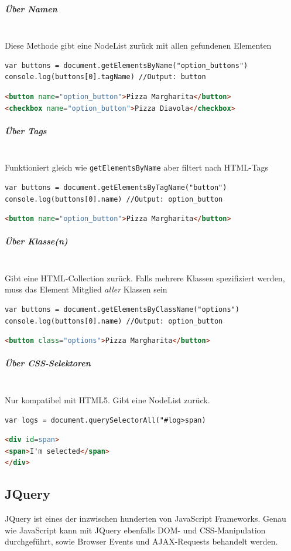 \documentclass[a4paper, 11pt]{article}
\newcommand{\code}[1]{\texttt{#1}}
\begin{document}
\subparagraph{Über Namen}\mbox{}\\
Diese Methode gibt eine NodeList zurück mit allen gefundenen Elementen
\begin{lstlisting}
var buttons = document.getElementsByName("option_buttons")
console.log(buttons[0].tagName) //Output: button
\end{lstlisting}
\begin{lstlisting}[language=html]
<button name="option_button">Pizza Margharita</button>
<checkbox name="option_button">Pizza Diavola</checkbox>
\end{lstlisting}

\subparagraph{Über Tags}\mbox{}\\
Funktioniert gleich wie \code{getElementsByName} aber filtert nach HTML-Tags
\begin{lstlisting}
var buttons = document.getElementsByTagName("button")
console.log(buttons[0].name) //Output: option_button
\end{lstlisting}
\begin{lstlisting}[language=html]
<button name="option_button">Pizza Margharita</button>
\end{lstlisting}

\subparagraph{Über Klasse(n)}\mbox{}\\
Gibt eine HTML-Collection zurück. Falls mehrere Klassen spezifiziert werden, muss das Element Mitglied \textit{aller} Klassen sein
\begin{lstlisting}
var buttons = document.getElementsByClassName("options")
console.log(buttons[0].name) //Output: option_button
\end{lstlisting}
\begin{lstlisting}[language=html]
<button class="options">Pizza Margharita</button>
\end{lstlisting}

\subparagraph{Über CSS-Selektoren}\mbox{}\\
Nur kompatibel mit HTML5. Gibt eine NodeList zurück.
\begin{lstlisting}
var logs = document.querySelectorAll("#log>span)
\end{lstlisting}
\begin{lstlisting}[language=html]
<div id=span>
<span>I'm selected</span>
</div>
\end{lstlisting}
\subsection{JQuery}
JQuery ist eines der inzwischen hunderten von JavaScript Frameworks. Genau wie JavaScript kann mit JQuery ebenfalls DOM- und CSS-Manipulation durchgeführt, sowie Browser Events und AJAX-Requests behandelt werden.
\end{document}
